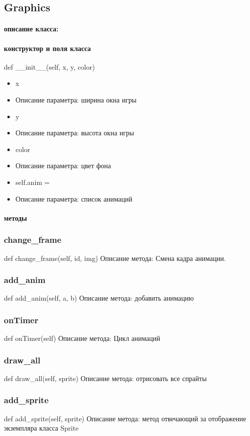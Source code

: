 \subsection{Graphics}
\paragraph{описание класса:}
\paragraph{конструктор и поля класса}
def \_\_init\_\_(self, x, y, color)
\begin{itemize}
	\item x 
	\item Описание параметра: ширина окна игры
	\item y
	\item Описание параметра: высота окна игры
	\item color
	\item Описание параметра: цвет фона
	\item self.anim = {}
	\item Описание параметра: список анимаций
\end{itemize}
\paragraph{методы}
\subsubsection{change\_frame}
def change\_frame(self, id, img)
Описание метода: Смена кадра анимации.
\subsubsection{add\_anim}
def add\_anim(self, a, b)
Описание метода: добавить анимацию
\subsubsection{onTimer}
def onTimer(self)
Описание метода: Цикл анимаций
\subsubsection{draw\_all}
def draw\_all(self, sprite)
Описание метода: отрисовать все спрайты
\subsubsection{add\_sprite}
def add\_sprite(self, sprite)
Описание метода: метод отвечающий за отображение экземпляра класса Sprite
